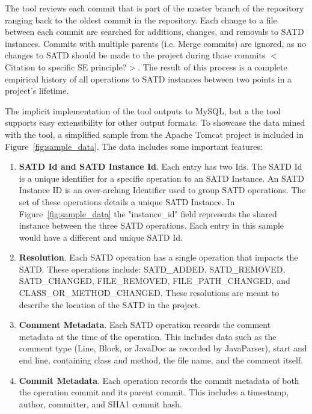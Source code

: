 \documentclass[conference]{IEEEtran}
\begin{document}
The tool reviews each commit that is part of the master branch of the repository ranging back to the oldest commit in the repository. Each change to a file between each commit are searched for additions, changes, and removals to SATD instances. Commits with multiple parents (i.e. Merge commits) are ignored, as no changes to SATD should be made to the project during those commits $<$Citation to specific SE principle?$>$. The result of this process is a complete empirical history of all operations to SATD instances between two points in a project's lifetime.

The implicit implementation of the tool outputs to MySQL, but a the tool supports easy extensibility for other output formats. To showcase the data mined with the tool, a simplified sample from the Apache Tomcat project is included in Figure~\ref{fig:sample_data}.
The data includes some important features:
\begin{enumerate}
    \item \textbf{SATD Id and SATD Instance Id}. Each entry has two Ids. The SATD Id is a unique identifier for a specific operation to an SATD Instance. An SATD Instance ID is an over-arching Identifier used to group SATD operations. The set of these operations details a unique SATD Instance. In Figure~\ref{fig:sample_data} the "instance\_id" field represents the shared instance between the three SATD operations. Each entry in this sample would have a different and unique SATD Id.
    \item \textbf{Resolution}. Each SATD operation has a single operation that impacts the SATD. These operations include: SATD\_ADDED, SATD\_REMOVED, SATD\_CHANGED, FILE\_REMOVED, FILE\_PATH\_CHANGED, and CLASS\_OR\_METHOD\_CHANGED. These resolutions are meant to describe the location of the SATD in the project.
    \item \textbf{Comment Metadata}. Each SATD operation records the comment metadata at the time of the operation. This includes data such as the comment type (Line, Block, or JavaDoc as recorded by JavaParser), start and end line, containing class and method, the file name, and the comment itself.
    \item \textbf{Commit Metadata}. Each operation records the commit metadata of both the operation commit and its parent commit. This includes a timestamp, author, committer, and SHA1 commit hash.
\end{enumerate}
\end{document}
